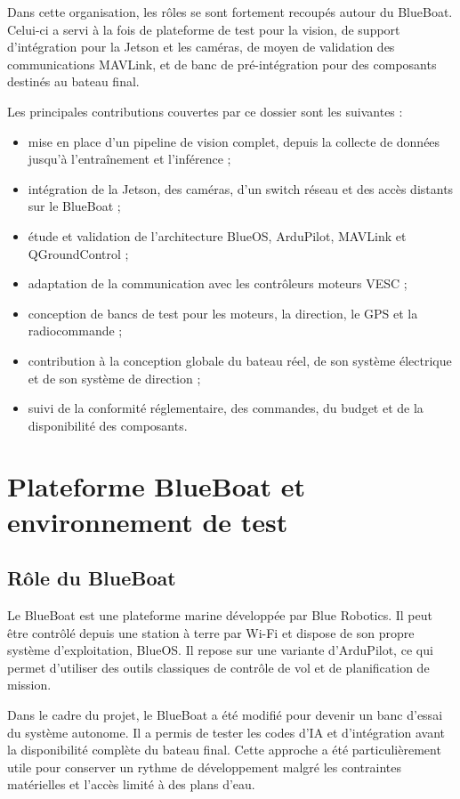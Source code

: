 \documentclass[11pt,letterpaper]{article}
\begin{document}
Dans cette organisation, les rôles se sont fortement recoupés autour du BlueBoat. Celui-ci a servi à la fois de plateforme de test pour la vision, de support d'intégration pour la Jetson et les caméras, de moyen de validation des communications MAVLink, et de banc de pré-intégration pour des composants destinés au bateau final.

Les principales contributions couvertes par ce dossier sont les suivantes :

\begin{itemize}
    \item mise en place d'un pipeline de vision complet, depuis la collecte de données jusqu'à l'entraînement et l'inférence ;
    \item intégration de la Jetson, des caméras, d'un switch réseau et des accès distants sur le BlueBoat ;
    \item étude et validation de l'architecture BlueOS, ArduPilot, MAVLink et QGroundControl ;
    \item adaptation de la communication avec les contrôleurs moteurs VESC ;
    \item conception de bancs de test pour les moteurs, la direction, le GPS et la radiocommande ;
    \item contribution à la conception globale du bateau réel, de son système électrique et de son système de direction ;
    \item suivi de la conformité réglementaire, des commandes, du budget et de la disponibilité des composants.
\end{itemize}

\section{Plateforme BlueBoat et environnement de test}

\subsection{Rôle du BlueBoat}

Le BlueBoat est une plateforme marine développée par Blue Robotics. Il peut être contrôlé depuis une station à terre par Wi-Fi et dispose de son propre système d'exploitation, BlueOS. Il repose sur une variante d'ArduPilot, ce qui permet d'utiliser des outils classiques de contrôle de vol et de planification de mission.

Dans le cadre du projet, le BlueBoat a été modifié pour devenir un banc d'essai du système autonome. Il a permis de tester les codes d'IA et d'intégration avant la disponibilité complète du bateau final. Cette approche a été particulièrement utile pour conserver un rythme de développement malgré les contraintes matérielles et l'accès limité à des plans d'eau.
\end{document}
